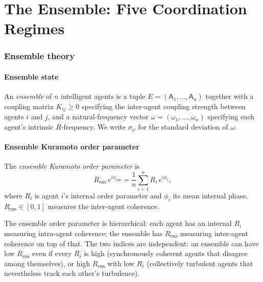 \documentclass[11pt,twocolumn,a4paper]{article}
\newcommand{\agent}{\mathsf{A}}
\newcommand{\Ord}{R}
\begin{document}
\part{The Ensemble: Five Coordination Regimes}

\section{Ensemble theory}
\label{sec:ensemble}

\subsection{Ensemble state}

\begin{definition}[Ensemble]\label{def:ens}
An \emph{ensemble} of $n$ intelligent agents is a tuple
$E=(\agent_1,\dots,\agent_n)$ together with a coupling matrix
$K_{ij}\ge 0$ specifying the inter-agent coupling strength between
agents $i$ and $j$, and a natural-frequency vector
$\omega=(\omega_1,\dots,\omega_n)$ specifying each agent's intrinsic
$R$-frequency. We write $\sigma_\omega$ for the standard deviation of
$\omega$.
\end{definition}

\subsection{Ensemble Kuramoto order parameter}

\begin{definition}\label{def:ens-R}
The \emph{ensemble Kuramoto order parameter} is
\[
\Ord_{\mathrm{ens}}\,e^{i\psi_{\mathrm{ens}}}=\frac{1}{n}\sum_{i=1}^n R_i\,e^{i\phi_i},
\]
where $R_i$ is agent $i$'s internal order parameter and $\phi_i$ its
mean internal phase. $\Ord_{\mathrm{ens}}\in[0,1]$ measures the
inter-agent coherence.
\end{definition}

\begin{remark}\label{rem:nested}
The ensemble order parameter is hierarchical: each agent has an
internal $R_i$ measuring intra-agent coherence; the ensemble has
$\Ord_{\mathrm{ens}}$ measuring inter-agent coherence on top of that.
The two indices are independent: an ensemble can have low
$\Ord_{\mathrm{ens}}$ even if every $R_i$ is high (synchronously
coherent agents that disagree among themselves), or high
$\Ord_{\mathrm{ens}}$ with low $R_i$ (collectively turbulent agents
that nevertheless track each other's turbulence).
\end{remark}
\end{document}
